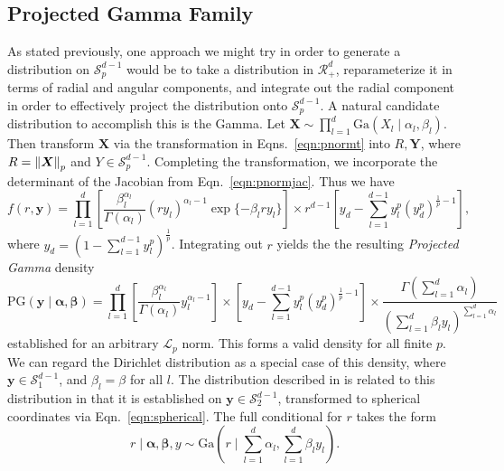 \subsection{Projected Gamma Family}
As stated previously, one approach we might try in order to generate a distribution on
  $\mathcal{S}_{p}^{d-1}$ would be to take a distribution in $\mathcal{R}_{+}^d$, reparameterize
  it in terms of radial and angular components, and integrate out the radial component in order to
  effectively project the distribution onto $\mathcal{S}_{p}^{d-1}$.  A natural candidate distribution
  to accomplish this is the Gamma.  Let $\bm{ X} \sim \prod_{l = 1}^d\text{Ga}\left(X_l\mid\alpha_l,\beta_l\right)$.
  Then transform $\bm{ X}$ via the transformation in Eqns.~\ref{eqn:pnormt} into $R,\bm{ Y}$, where
  $R = \left\lVert \bm{ X} \right\rVert_{p}$ and $Y\in \mathcal{S}_{p}^{d-1}$.  Completing the transformation, we
  incorporate the determinant of the Jacobian from Eqn.~\ref{eqn:pnormjac}.  Thus we have
  \begin{equation}
    \label{eqn:protopg}
    f(r,\bm{ y}) = \prod_{l = 1}^{d}
      \left[\frac{\beta_l^{\alpha_l}}{\Gamma(\alpha_l)}(ry_l)^{\alpha_l - 1}\exp\lbrace-\beta_lry_l\rbrace\right]
      \times r^{d-1}\left[y_d - {\textstyle \sum}_{l = 1}^{d-1}y_l^p\left(y_d^p\right)^{\frac{1}{p} - 1}\right],
  \end{equation}
  where $y_d = \left(1 - \sum_{l=1}^{d-1}y_l^p\right)^{\frac{1}{p}}$. Integrating out $r$ yields the
  the resulting \emph{Projected Gamma} density
  \begin{equation}
    \label{eqn:projgamma}
    \text{PG}(\bm{ y}\mid\bm{ \alpha},\bm{ \beta}) = \prod_{l = 1}^d\left[\frac{\beta_l^{\alpha_l}}{\Gamma(\alpha_l)}y_l^{\alpha_l - 1}\right]
      \times \left[y_d - {\textstyle \sum}_{l = 1}^{d-1}y_l^p\left(y_d^p\right)^{\frac{1}{p} - 1}\right]
      \times \frac{\Gamma({\textstyle\sum}_{l = 1}^d\alpha_l)}{\left({\scriptstyle\sum}_{l = 1}^d \beta_ly_l\right)^{{\textstyle\sum_{l = 1}^d \alpha_l}}}
  \end{equation}
  established for an arbitrary $\mathcal{L}_p$ norm. This forms a valid density for all finite $p$.
  We can regard the Dirichlet distribution as a special case of this density, where
  $\bm{ y}\in \mathcal{S}_1^{d-1}$, and $\beta_l = \beta$ for all $l$.  The distribution described
  in \cite{nunez2019} is related to this distribution in that it is established on
  $\bm{ y}\in \mathcal{S}_2^{d-1}$, transformed to spherical coordinates via Eqn.~\ref{eqn:spherical}.
  The full conditional for $r$ takes the form
  \begin{equation}
    \label{eqn:rfullcond}
    r\mid\bm{ \alpha},\bm{ \beta}, y \sim \text{Ga}\left(r\mid\sum_{l = 1}^d \alpha_l, \sum_{l = 1}^d \beta_ly_l\right).
  \end{equation}

